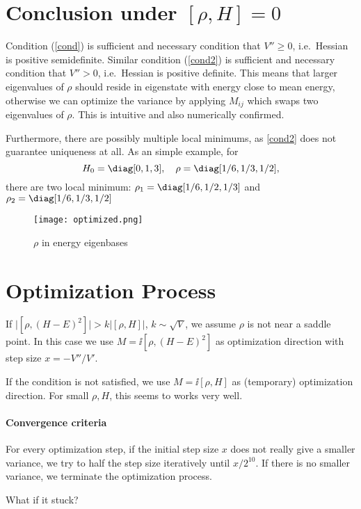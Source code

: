 \documentclass[10pt]{article}
\begin{document}
\section{Conclusion under \texorpdfstring{$[\rho, H]=0$}{[rho, H]=0}}

Condition (\ref{cond}) is sufficient and necessary condition that $V''\geq 0$, i.e.\ Hessian is positive semidefinite. Similar condition (\ref{cond2}) is sufficient and necessary condition that $V''> 0$, i.e.\ Hessian is positive definite. This means that larger eigenvalues of $\rho$ should reside in eigenstate with energy close to mean energy, otherwise we can optimize the variance by applying $M_{ij}$ which swaps two eigenvalues of $\rho$. This is intuitive and also numerically confirmed.

Furthermore, there are possibly multiple local minimums, as \ref{cond2} does not guarantee uniqueness at all. As an simple example, for \[H_0=\diag[0,1,3],\quad\rho=\diag[1/6,1/3,1/2],\]there are two local minimum: $\rho_1=\diag[1/6,1/2,1/3]$ and $\rho_2=\diag[1/6,1/3,1/2]$
\begin{figure}[htb]
\centering
\texttt{[image: optimized.png]}
\caption{$\rho$ in energy eigenbases}
\end{figure} 
\section{Optimization Process}
If $\big|[\rho, (H-E)^2]\big|>k\big|[\rho, H]\big|$, $k\sim\sqrt{V}$, we assume $\rho$ is not near a saddle point. In this case we use $M=\ii[\rho, (H-E)^2]$ as optimization direction with step size $x=-V''/V'$. 

If the condition is not satisfied, we use $M=\ii [\rho, H]$ as (temporary) optimization direction. For small $\rho, H$, this seems to works very well.

\paragraph{Convergence criteria} For every optimization step, if the initial step size $x$ does not really give a smaller variance, we try to half the step size iteratively until $x/2^{10}$. If there is no smaller variance, we terminate the optimization process. 

What if it stuck?
\end{document}

